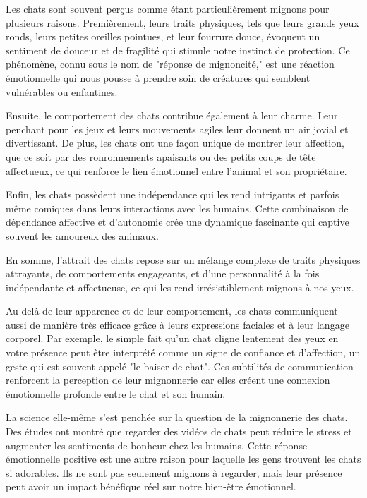 \documentclass{report}
\begin{document}
Les chats sont souvent perçus comme étant particulièrement mignons pour plusieurs raisons. Premièrement, leurs traits physiques, tels que leurs grands yeux ronds, leurs petites oreilles pointues, et leur fourrure douce, évoquent un sentiment de douceur et de fragilité qui stimule notre instinct de protection. Ce phénomène, connu sous le nom de "réponse de mignoncité," est une réaction émotionnelle qui nous pousse à prendre soin de créatures qui semblent vulnérables ou enfantines.
\par %
\smallskip %
\noindent %
Ensuite, le comportement des chats contribue également à leur charme. Leur penchant pour les jeux et leurs mouvements agiles leur donnent un air jovial et divertissant. De plus, les chats ont une façon unique de montrer leur affection, que ce soit par des ronronnements apaisants ou des petits coups de tête affectueux, ce qui renforce le lien émotionnel entre l'animal et son propriétaire.
\par %
\smallskip %
\noindent
Enfin, les chats possèdent une indépendance qui les rend intrigants et parfois même comiques dans leurs interactions avec les humains. Cette combinaison de dépendance affective et d'autonomie crée une dynamique fascinante qui captive souvent les amoureux des animaux.
\par %
\smallskip %
\noindent
En somme, l'attrait des chats repose sur un mélange complexe de traits physiques attrayants, de comportements engageants, et d'une personnalité à la fois indépendante et affectueuse, ce qui les rend irrésistiblement mignons à nos yeux.
\par %
\medskip %
\noindent
Au-delà de leur apparence et de leur comportement, les chats communiquent aussi de manière très efficace grâce à leurs expressions faciales et à leur langage corporel. Par exemple, le simple fait qu’un chat cligne lentement des yeux en votre présence peut être interprété comme un signe de confiance et d'affection, un geste qui est souvent appelé "le baiser de chat". Ces subtilités de communication renforcent la perception de leur mignonnerie car elles créent une connexion émotionnelle profonde entre le chat et son humain.
\par %
\smallskip %
\noindent
La science elle-même s'est penchée sur la question de la mignonnerie des chats. Des études ont montré que regarder des vidéos de chats peut réduire le stress et augmenter les sentiments de bonheur chez les humains. Cette réponse émotionnelle positive est une autre raison pour laquelle les gens trouvent les chats si adorables. Ils ne sont pas seulement mignons à regarder, mais leur présence peut avoir un impact bénéfique réel sur notre bien-être émotionnel.
\end{document}
